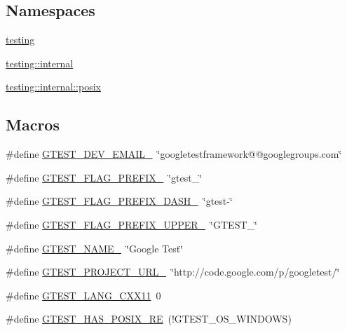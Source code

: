 \subsection*{Namespaces}
\begin{DoxyCompactItemize}
\item 
 \hyperlink{namespacetesting}{testing}
\item 
 \hyperlink{namespacetesting_1_1internal}{testing\+::internal}
\item 
 \hyperlink{namespacetesting_1_1internal_1_1posix}{testing\+::internal\+::posix}
\end{DoxyCompactItemize}
\subsection*{Macros}
\begin{DoxyCompactItemize}
\item 
\#define \hyperlink{gtest-port_8h_a21086d276b1a64d6763ee8a94b12c1b8}{G\+T\+E\+S\+T\+\_\+\+D\+E\+V\+\_\+\+E\+M\+A\+I\+L\+\_\+}~\char`\"{}googletestframework@@googlegroups.\+com\char`\"{}
\item 
\#define \hyperlink{gtest-port_8h_a088e84784c589ba9b1fc48602ad8eabf}{G\+T\+E\+S\+T\+\_\+\+F\+L\+A\+G\+\_\+\+P\+R\+E\+F\+I\+X\+\_\+}~\char`\"{}gtest\+\_\+\char`\"{}
\item 
\#define \hyperlink{gtest-port_8h_a4251ff898f9f94ec6b8b9402c3436759}{G\+T\+E\+S\+T\+\_\+\+F\+L\+A\+G\+\_\+\+P\+R\+E\+F\+I\+X\+\_\+\+D\+A\+S\+H\+\_\+}~\char`\"{}gtest-\/\char`\"{}
\item 
\#define \hyperlink{gtest-port_8h_a4018b7f288f974d022df397e2730633a}{G\+T\+E\+S\+T\+\_\+\+F\+L\+A\+G\+\_\+\+P\+R\+E\+F\+I\+X\+\_\+\+U\+P\+P\+E\+R\+\_\+}~\char`\"{}G\+T\+E\+S\+T\+\_\+\char`\"{}
\item 
\#define \hyperlink{gtest-port_8h_a13d98c217176bd8722c395b9225fc19d}{G\+T\+E\+S\+T\+\_\+\+N\+A\+M\+E\+\_\+}~\char`\"{}Google Test\char`\"{}
\item 
\#define \hyperlink{gtest-port_8h_a5aa3c938fc1d049f1d9c5332f6a0b1d4}{G\+T\+E\+S\+T\+\_\+\+P\+R\+O\+J\+E\+C\+T\+\_\+\+U\+R\+L\+\_\+}~\char`\"{}http\+://code.\+google.\+com/p/googletest/\char`\"{}
\item 
\#define \hyperlink{gtest-port_8h_a6e310924e9ce4a9f8fda1b189cc680c4}{G\+T\+E\+S\+T\+\_\+\+L\+A\+N\+G\+\_\+\+C\+X\+X11}~0
\item 
\#define \hyperlink{gtest-port_8h_af5c4295ea1d76f07f65934f659792431}{G\+T\+E\+S\+T\+\_\+\+H\+A\+S\+\_\+\+P\+O\+S\+I\+X\+\_\+\+R\+E}~(!G\+T\+E\+S\+T\+\_\+\+O\+S\+\_\+\+W\+I\+N\+D\+O\+W\+S)

\end{DoxyCompactItemize}
